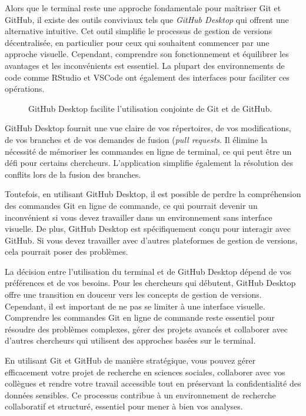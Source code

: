 \documentclass[
  letterpaper,
  DIV=11,
  numbers=noendperiod]{scrreprt}
\begin{document}
Alors que le terminal reste une approche fondamentale pour maîtriser Git
et GitHub, il existe des outils conviviaux tels que \emph{GitHub
Desktop} qui offrent une alternative intuitive. Cet outil simplifie le
processus de gestion de versions décentralisée, en particulier pour ceux
qui souhaitent commencer par une approche visuelle. Cependant,
comprendre son fonctionnement et équilibrer les avantages et les
inconvénients est essentiel. La plupart des environnements de code comme
RStudio et VSCode ont également des interfaces pour faciliter ces
opérations.

\begin{figure}


\caption{\label{fig-github}GitHub Desktop facilite l'utilisation
conjointe de Git et de GitHub.}

\end{figure}%

GitHub Desktop fournit une vue claire de vos répertoires, de vos
modifications, de vos branches et de vos demandes de fusion (\emph{pull
requests}. Il élimine la nécessité de mémoriser les commandes en ligne
de terminal, ce qui peut être un défi pour certains chercheurs.
L'application simplifie également la résolution des conflits lors de la
fusion des branches.

Toutefois, en utilisant GitHub Desktop, il est possible de perdre la
compréhension des commandes Git en ligne de commande, ce qui pourrait
devenir un inconvénient si vous devez travailler dans un environnement
sans interface visuelle. De plus, GitHub Desktop est spécifiquement
conçu pour interagir avec GitHub. Si vous devez travailler avec d'autres
plateformes de gestion de versions, cela pourrait poser des problèmes.

La décision entre l'utilisation du terminal et de GitHub Desktop dépend
de vos préférences et de vos besoins. Pour les chercheurs qui débutent,
GitHub Desktop offre une transition en douceur vers les concepts de
gestion de versions. Cependant, il est important de ne pas se limiter à
une interface visuelle. Comprendre les commandes Git en ligne de
commande reste essentiel pour résoudre des problèmes complexes, gérer
des projets avancés et collaborer avec d'autres chercheurs qui utilisent
des approches basées sur le terminal.

En utilisant Git et GitHub de manière stratégique, vous pouvez gérer
efficacement votre projet de recherche en sciences sociales, collaborer
avec vos collègues et rendre votre travail accessible tout en préservant
la confidentialité des données sensibles. Ce processus contribue à un
environnement de recherche collaboratif et structuré, essentiel pour
mener à bien vos analyses.
\end{document}

